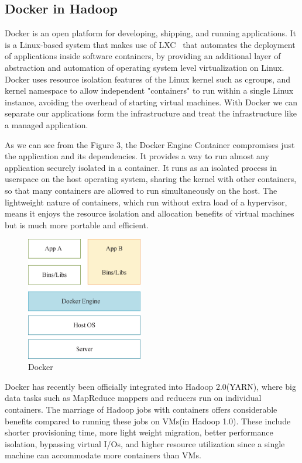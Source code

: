 \subsection{Docker in Hadoop}
Docker is an open platform for developing, shipping, and running applications. It is a Linux-based system that makes use of LXC~\cite{helsley2009lxc} that automates the deployment of applications inside software containers, by providing an additional layer of abstraction and automation of operating system level virtualization on Linux. Docker uses resource isolation features of the Linux kernel such as cgroups, and kernel namespace to allow independent "containers" to run within a single Linux instance, avoiding the overhead of starting virtual machines. With Docker we can separate our applications form the infrastructure and treat the infrastructure like a managed application. 

As we can see from the Figure 3, the Docker Engine Container compromises just the application and its dependencies. It provides a way to run almost any application securely isolated in a container. It runs as an isolated process in userspace on the host operating system, sharing the kernel with other containers, so that many containers are allowed to run simultaneously on the host. The lightweight nature of containers, which run without extra load of a hypervisor, means it enjoys the resource isolation and allocation benefits of virtual machines but is much more portable and efficient.

\begin{figure}[t]
  \centering
  \includegraphics[width=2in]{figs/docker.eps}
  \caption{Docker}
  \label{fig:overview}
\end{figure}

Docker has recently been officially integrated into Hadoop 2.0(YARN), where big data tasks such as MapReduce mappers and reducers run on individual containers. The marriage of Hadoop jobs with containers offers considerable benefits compared to running these jobs on VMs(in Hadoop 1.0). These include shorter provisioning time, more light weight migration, better performance isolation, bypassing virtual I/Os, and higher resource utilization since a single machine can accommodate more containers than VMs. 

